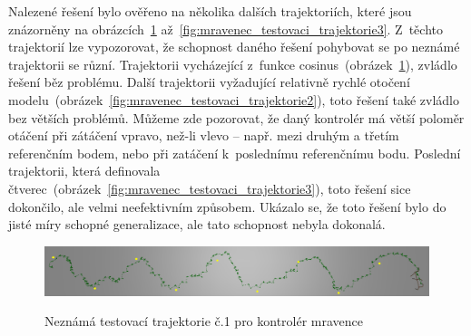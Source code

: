Nalezené řešení bylo ověřeno na několika dalších trajektoriích, které jsou znázorněny na obrázcích~\ref{fig:mravenec_testovaci_trajektorie1} až~\ref{fig:mravenec_testovaci_trajektorie3}.
Z~těchto trajektorií lze vypozorovat, že schopnost daného řešení pohybovat se po neznámé trajektorii se různí.
Trajektorii vycházející z~funkce cosinus~(obrázek~\ref{fig:mravenec_testovaci_trajektorie1}), zvládlo řešení běz problému.
Další trajektorii vyžadující relativně rychlé otočení modelu~(obrázek~\ref{fig:mravenec_testovaci_trajektorie2}), toto řešení také zvládlo bez větších problémů.
Můžeme zde pozorovat, že daný kontrolér má větší poloměr otáčení při zátáčení vpravo, než-li vlevo -- např. mezi druhým a třetím referenčním bodem, nebo při zatáčení k~poslednímu referenčnímu bodu.
Poslední trajektorii, která definovala čtverec~(obrázek~\ref{fig:mravenec_testovaci_trajektorie3}), toto řešení sice dokončilo, ale velmi neefektivním způsobem.
Ukázalo se, že toto řešení bylo do jisté míry schopné generalizace, ale tato schopnost nebyla dokonalá.


\begin{figure}[h]
    \centering
    {\includegraphics[width=\linewidth]{obrazky/mravenec_testovaci_trajektorie1.png}}
    \caption{
    Neznámá testovací trajektorie č.1 pro kontrolér mravence
    }
    \label{fig:mravenec_testovaci_trajektorie1}
\end{figure}

